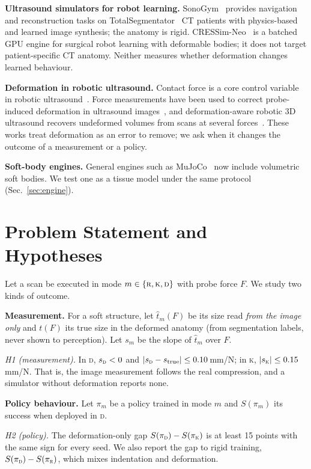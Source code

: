 \documentclass[conference]{IEEEtran}
\newcommand{\RM}{\textsc{r}}   %
\newcommand{\KM}{\textsc{k}}   %
\newcommand{\DM}{\textsc{d}}   %
\begin{document}
\textbf{Ultrasound simulators for robot learning.} SonoGym~\cite{ao2025sonogym} provides navigation and
reconstruction tasks on TotalSegmentator~\cite{wasserthal2023totalsegmentator} CT patients with physics-based and
learned image synthesis; the anatomy is rigid. CRESSim-Neo~\cite{ou2026cressimneo} is a batched GPU engine for
surgical robot learning with deformable bodies; it does not target patient-specific CT anatomy. Neither measures
whether deformation changes learned behaviour.

\textbf{Deformation in robotic ultrasound.} Contact force is a core control variable in robotic
ultrasound~\cite{jiang2023review}. Force measurements have been used to correct probe-induced deformation in
ultrasound images~\cite{burcher2001deformation}, and deformation-aware robotic 3D ultrasound recovers undeformed
volumes from scans at several forces~\cite{jiang2021deformation}. These works treat deformation as an error to remove;
we ask when it changes the outcome of a measurement or a policy.

\textbf{Soft-body engines.} General engines such as MuJoCo~\cite{todorov2012mujoco} now include volumetric soft
bodies. We test one as a tissue model under the same protocol (Sec.~\ref{sec:engine}).

\section{Problem Statement and Hypotheses}
\label{sec:hyp}

Let a scan be executed in mode $m\in\{\RM,\KM,\DM\}$ with probe force $F$. We study two kinds of outcome.

\textbf{Measurement.} For a soft structure, let $\hat{t}_m(F)$ be its size read \emph{from the image only} and $t(F)$
its true size in the deformed anatomy (from segmentation labels, never shown to perception). Let $s_m$ be the slope of
$\hat{t}_m$ over $F$.

\emph{H1 (measurement).} In \DM, $s_\DM<0$ and $|s_\DM - s_{\rm true}|\le 0.10$\,mm/N; in \KM, $|s_\KM|\le 0.15$\,mm/N.
That is, the image measurement follows the real compression, and a simulator without deformation reports none.

\textbf{Policy behaviour.} Let $\pi_m$ be a policy trained in mode $m$ and $S(\pi_m)$ its success when deployed in \DM.

\emph{H2 (policy).} The deformation-only gap $S(\pi_\DM)-S(\pi_\KM)$ is at least 15 points with the same sign for
every seed. We also report the gap to rigid training, $S(\pi_\DM)-S(\pi_\RM)$, which mixes indentation and
deformation.
\end{document}
